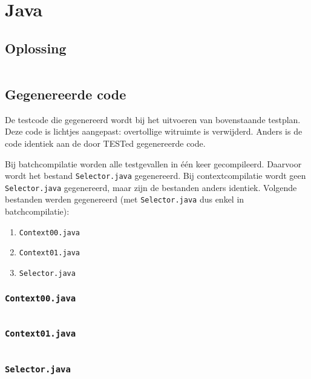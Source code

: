\section{Java}\label{sec:echo-java}

\subsection{Oplossing}\label{subsec:echo-java-oplossing}

\inputminted{java}{sources/echo/correct.java}

\subsection{Gegenereerde code}\label{subsec:echo-java-gegenereerde-code}

De testcode die gegenereerd wordt bij het uitvoeren van bovenstaande testplan.
Deze code is lichtjes aangepast: overtollige witruimte is verwijderd.
Anders is de code identiek aan de door TESTed gegenereerde code.

Bij batchcompilatie worden alle testgevallen in één keer gecompileerd.
Daarvoor wordt het bestand \texttt{Selector.java} gegenereerd.
Bij contextcompilatie wordt geen \texttt{Selector.java} gegenereerd, maar zijn de bestanden anders identiek.
Volgende bestanden werden gegenereerd (met \texttt{Selector.java} dus enkel in batchcompilatie):

\begin{enumerate}
    \item \texttt{Context00.java}
    \item \texttt{Context01.java}
    \item \texttt{Selector.java}
\end{enumerate}

\subsubsection{\texttt{Context00.java}}

\inputminted{java}{sources/echo/Context00.java}

\subsubsection{\texttt{Context01.java}}

\inputminted{java}{sources/echo/Context01.java}

\subsubsection{\texttt{Selector.java}}

